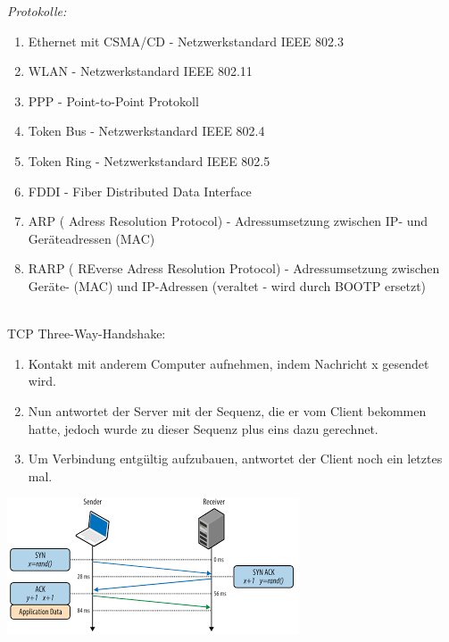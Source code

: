 \documentclass[11pt]{article}
\begin{document}
\begin{enumerate}
        \begin{addmargin}[1em]{1em}
            \emph{Protokolle:}\\
            \begin{enumerate}[$\diamond$]
                \item Ethernet mit CSMA/CD - Netzwerkstandard IEEE 802.3\\
                \item WLAN - Netzwerkstandard IEEE 802.11\\
                \item PPP - Point-to-Point Protokoll\\
                \item Token Bus - Netzwerkstandard IEEE 802.4\\
                \item Token Ring - Netzwerkstandard IEEE 802.5\\
                \item FDDI - Fiber Distributed Data Interface\\
                \item ARP ( Adress Resolution Protocol) - Adressumsetzung zwischen IP- und Geräteadressen (MAC)\\
                \item RARP ( REverse Adress Resolution Protocol) - Adressumsetzung zwischen Geräte- (MAC) und IP-Adressen
                (veraltet - wird durch BOOTP ersetzt)\\\\
            \end{enumerate}
        \end{addmargin}
    \end{enumerate}

    TCP Three-Way-Handshake:
    \begin{enumerate}
        \item Kontakt mit anderem Computer aufnehmen, indem Nachricht x gesendet wird.
        \item Nun antwortet der Server mit der Sequenz, die er vom Client bekommen hatte,
        jedoch wurde zu dieser Sequenz plus eins dazu gerechnet.
        \item Um Verbindung entgültig aufzubauen, antwortet der Client noch ein letztes mal.\\
    \end{enumerate}
    \includegraphics[width=\textwidth]{images.png}
\end{document}
